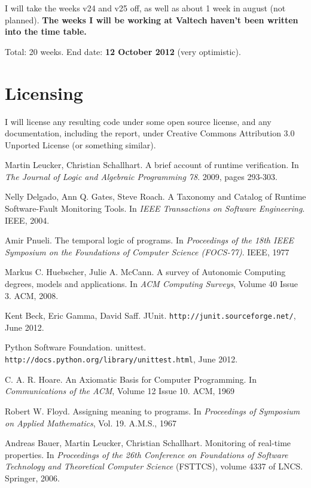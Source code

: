 \documentclass[a4paper,11pt]{article}
\begin{document}
I will take the weeks v24 and v25 off, as well as about 1 week in august (not planned).
\textbf{The weeks I will be working at Valtech haven't been written into the time table.}

Total: 20 weeks. End date: \textbf{12 October 2012} (very optimistic).


\section{Licensing}

I will license any resulting code under some open source license, and any documentation, including the report, under Creative Commons Attribution 3.0 Unported License \cite{cc-by} (or something similar).


\begin{thebibliography}{99}

	Martin Leucker, Christian Schallhart.
	A brief account of runtime verification.
	In \emph{The Journal of Logic and Algebraic Programming 78}.
	2009, pages 293-303.

	Nelly Delgado, Ann Q. Gates, Steve Roach.
	A Taxonomy and Catalog of Runtime Software-Fault Monitoring Tools.
	In \emph{IEEE Transactions on Software Engineering}.
	IEEE, 2004.

	Amir Pnueli.
	The temporal logic of programs. 
	In \emph{Proceedings of the 18th IEEE Symposium on the Foundations of Computer Science (FOCS-77)}.
	IEEE, 1977

	Markus C. Huebscher, Julie A. McCann.
	A survey of Autonomic Computing \- degrees, models and applications.
	In \emph{ACM Computing Surveys}, Volume 40 Issue 3.
	ACM, 2008.
	
	Kent Beck, Eric Gamma, David Saff.
	JUnit.
	\texttt{http://junit.sourceforge.net/},
	June 2012.

	Python Software Foundation.
	unittest.
	\texttt{http://docs.python.org/library/unittest.html},
	June 2012.

	C. A. R. Hoare.
	An Axiomatic Basis for Computer Programming.
	In \emph{Communications of the ACM}, Volume 12 Issue 10.
	ACM, 1969

	Robert W. Floyd.
	Assigning meaning to programs.
	In \emph{Proceedings of Symposium on Applied Mathematics}, Vol. 19.
	A.M.S., 1967

	Andreas Bauer, Martin Leucker, Christian Schallhart.
	Monitoring of real-time properties.
	In \emph{Proceedings of the 26th Conference on Foundations of Software Technology and Theoretical Computer Science} (FSTTCS), volume 4337 of LNCS.
	Springer, 2006.


\end{thebibliography}
\end{document}
